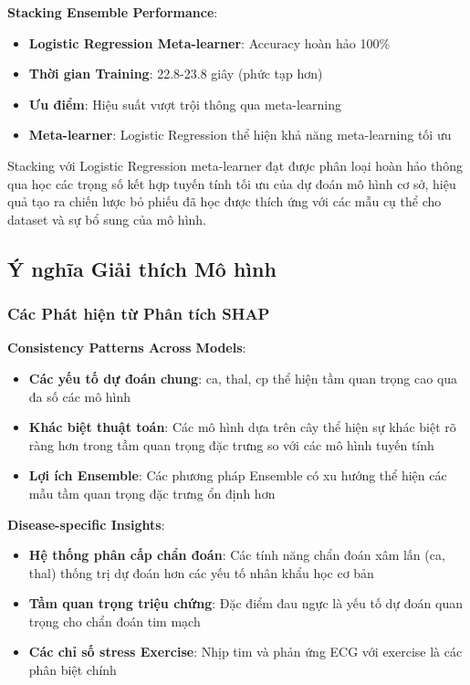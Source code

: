 \textbf{Stacking Ensemble Performance}:
\begin{itemize}
    \item \textbf{Logistic Regression Meta-learner}: Accuracy hoàn hảo 100\%
    \item \textbf{Thời gian Training}: 22.8-23.8 giây (phức tạp hơn)
    \item \textbf{Ưu điểm}: Hiệu suất vượt trội thông qua meta-learning
    \item \textbf{Meta-learner}: Logistic Regression thể hiện khả năng meta-learning tối ưu
\end{itemize}
Stacking với Logistic Regression meta-learner đạt được phân loại hoàn hảo thông qua học các trọng số kết hợp tuyến tính tối ưu của dự đoán mô hình cơ sở, hiệu quả tạo ra chiến lược bỏ phiếu đã học được thích ứng với các mẫu cụ thể cho dataset và sự bổ sung của mô hình.

\subsection{Ý nghĩa Giải thích Mô hình}\label{subsec:detailed-interpretability-insights}

\subsubsection{Các Phát hiện từ Phân tích SHAP}

\textbf{Consistency Patterns Across Models}:
\begin{itemize}
    \item \textbf{Các yếu tố dự đoán chung}: ca, thal, cp thể hiện tầm quan trọng cao qua đa số các mô hình
    \item \textbf{Khác biệt thuật toán}: Các mô hình dựa trên cây thể hiện sự khác biệt rõ ràng hơn trong tầm quan trọng đặc trưng so với các mô hình tuyến tính
    \item \textbf{Lợi ích Ensemble}: Các phương pháp Ensemble có xu hướng thể hiện các mẫu tầm quan trọng đặc trưng ổn định hơn
\end{itemize}

\textbf{Disease-specific Insights}:
\begin{itemize}
    \item \textbf{Hệ thống phân cấp chẩn đoán}: Các tính năng chẩn đoán xâm lấn (ca, thal) thống trị dự đoán hơn các yếu tố nhân khẩu học cơ bản
    \item \textbf{Tầm quan trọng triệu chứng}: Đặc điểm đau ngực là yếu tố dự đoán quan trọng cho chẩn đoán tim mạch
    \item \textbf{Các chỉ số stress Exercise}: Nhịp tim và phản ứng ECG với exercise là các phân biệt chính
\end{itemize}

